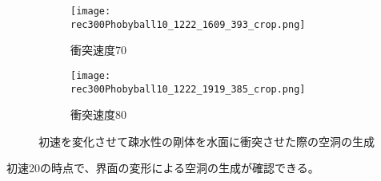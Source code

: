 \documentclass[]{jsarticle}
\begin{document}
\clearpage
\begin{figure}
\ContinuedFloat
  \begin{subfigure}{0.3\columnwidth}
  \centering
  \texttt{[image: rec300Phobyball10\_1222\_1609\_393\_crop.png]}
  \caption{衝突速度70}
  \label{fig:vel70}
\end{subfigure}
\begin{subfigure}{0.3\columnwidth}
  \centering
  \texttt{[image: rec300Phobyball10\_1222\_1919\_385\_crop.png]}
  \caption{衝突速度80}
  \label{fig:vel80}
\end{subfigure}
\caption{初速を変化させて疎水性の剛体を水面に衝突させた際の空洞の生成}
\label{fig:MachLPhoby}
\end{figure}
初速20の時点で、界面の変形による空洞の生成が確認できる。
\end{document}
